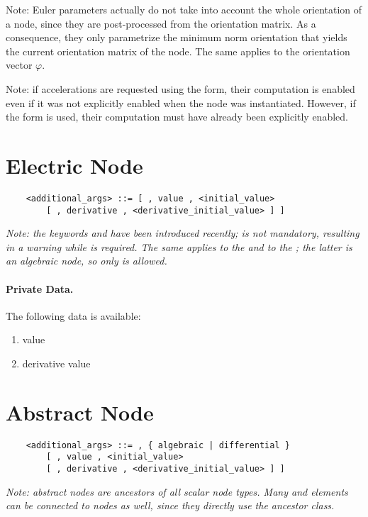 Note: Euler parameters actually do not take into account 
the whole orientation of a node, since they are post-processed
from the orientation matrix.
As a consequence, they only parametrize the minimum norm orientation
that yields the current orientation matrix of the node.
The same applies to the orientation vector $\varphi$.

Note: if accelerations are requested using the  form,
their computation is enabled even if it was not explicitly enabled
when the node was instantiated.
However, if the  form is used, their computation must have
already been explicitly enabled.


\section{Electric Node}
\begin{verbatim}
    <additional_args> ::= [ , value , <initial_value>
        [ , derivative , <derivative_initial_value> ] ]
\end{verbatim}
\emph{Note: the keywords  and 
have been introduced recently;  is not mandatory,
resulting in a warning while  is required.
The same applies to the  
and to the ; the latter is an algebraic
node, so only  is allowed.
}

\paragraph{Private Data.}
\label{sec:NODE:ELECTRIC:PRIV}
The following data is available:
\begin{enumerate}
\item {} value
\item {} derivative value
\end{enumerate}





\section{Abstract Node}
\begin{verbatim}
    <additional_args> ::= , { algebraic | differential }
        [ , value , <initial_value>
        [ , derivative , <derivative_initial_value> ] ]
\end{verbatim}
\emph{
	Note: abstract nodes are ancestors of all scalar node types.
	Many  and  elements can be connected
	to  nodes as well, since they directly use
	the ancestor class. 
}


